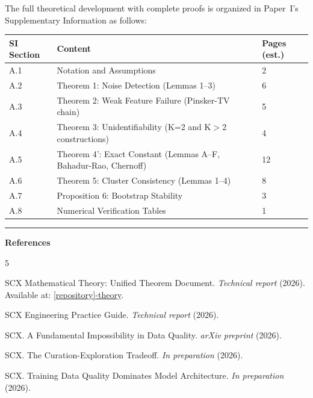 \documentclass{article}
\begin{document}
The full theoretical development with complete proofs is organized in Paper~I's Supplementary Information as follows:

\begin{longtable}{p{} p{} p{}}
\toprule
\textbf{SI Section} & \textbf{Content} & \textbf{Pages (est.)} \\
\midrule
\endhead

\bottomrule
\endfoot

A.1 & Notation and Assumptions & 2 \\
A.2 & Theorem 1: Noise Detection (Lemmas 1--3) & 6 \\
A.3 & Theorem 2: Weak Feature Failure (Pinsker-TV chain) & 5 \\
A.4 & Theorem 3: Unidentifiability (K=2 and K$>$2 constructions) & 4 \\
A.5 & Theorem 4': Exact Constant (Lemmas A--F, Bahadur-Rao, Chernoff) & 12 \\
A.6 & Theorem 5: Cluster Consistency (Lemmas 1--4) & 8 \\
A.7 & Proposition 6: Bootstrap Stability & 3 \\
A.8 & Numerical Verification Tables & 1 \\
\end{longtable}

\vfill

\begin{center}
\rule{0.5\textwidth}{0.5pt}
\end{center}

\noindent\textbf{References}


\begin{thebibliography}{5}

SCX Mathematical Theory: Unified Theorem Document. \emph{Technical report} (2026). Available at: \url{[repository]-theory}.

SCX Engineering Practice Guide. \emph{Technical report} (2026).

SCX. A Fundamental Impossibility in Data Quality. \emph{arXiv preprint} (2026).

SCX. The Curation-Exploration Tradeoff. \emph{In preparation} (2026).

SCX. Training Data Quality Dominates Model Architecture. \emph{In preparation} (2026).

\end{thebibliography}
\end{document}
